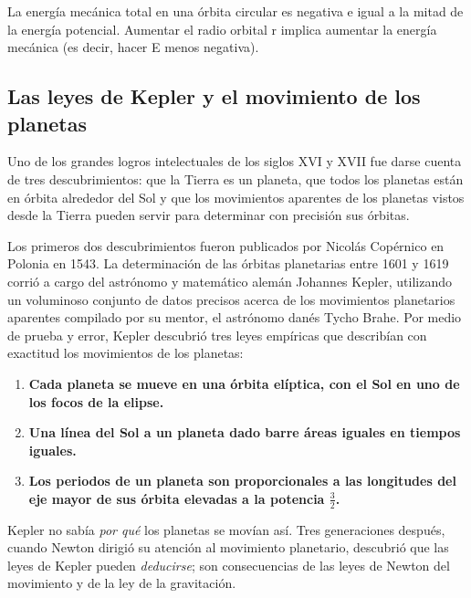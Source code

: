 \documentclass{article}
\newcommand{\newsubsection}[1]{
    \vspace{0.5cm}
    \color{sectionColor}
    \subsection{\bl{#1}}
    \color{black}
    \vspace{0.5cm}
}
\newcommand{\bl}[1]{\textbf{#1}}
\newcommand{\definicion}[1]{%
    \vspace{0.5cm}
    \begin{definicionbox}
        #1
    \end{definicionbox}
    \vspace{0.5cm}
}
\begin{document}
    \par La energía mecánica total en una órbita circular es negativa e igual a la mitad de la energía potencial. Aumentar el radio orbital r implica aumentar la energía mecánica (es decir, hacer E menos negativa).

    \newsubsection{Las leyes de Kepler y el movimiento de los planetas}

    \par Uno de los grandes logros intelectuales de los siglos XVI y XVII fue darse cuenta de tres descubrimientos: que la Tierra es un planeta, que todos los planetas están en órbita alrededor del Sol y que los movimientos aparentes de los planetas vistos desde la Tierra pueden servir para determinar con precisión sus órbitas.

    \vspace{0.2cm}

    \par Los primeros dos descubrimientos fueron publicados por Nicolás Copérnico en Polonia en 1543. La determinación de las órbitas planetarias entre 1601 y 1619 corrió a cargo del astrónomo y matemático alemán Johannes Kepler, utilizando un voluminoso conjunto de datos precisos acerca de los movimientos planetarios aparentes compilado por su mentor, el astrónomo danés Tycho Brahe. Por medio de prueba y error, Kepler descubrió tres leyes empíricas que describían con exactitud los movimientos de los planetas:

    \definicion{
        \begin{enumerate}
            \item \bl{Cada planeta se mueve en una órbita elíptica, con el Sol en uno de los focos de la elipse.}
            \item \bl{Una línea del Sol a un planeta dado barre áreas iguales en tiempos iguales.}
            \item \bl{Los periodos de un planeta son proporcionales a las longitudes del eje mayor de sus órbita elevadas a la potencia $\frac{3}{2}$.}
        \end{enumerate}
    }

    \par Kepler no sabía \textit{por qué} los planetas se movían así. Tres generaciones después, cuando Newton dirigió su atención al movimiento planetario, descubrió que las leyes de Kepler pueden \textit{deducirse}; son consecuencias de las leyes de Newton del movimiento y de la ley de la gravitación.

    \pagebreak
\end{document}
